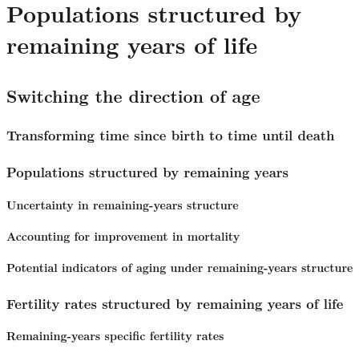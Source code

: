 \part*{Populations structured by remaining years of life}
  \chapter{Switching the direction of age}
  
  
  \section{Transforming time since birth to time until death}
    
   
  \section{Populations structured by remaining years}
    
    \subsection{Uncertainty in remaining-years structure}
      
    \subsection{Accounting for improvement in mortality}
      
    \subsection{Potential indicators of aging under remaining-years structure}
      
  \section{Fertility rates structured by remaining years of life}
    
    
    \subsection{Remaining-years specific fertility rates}
      
      
